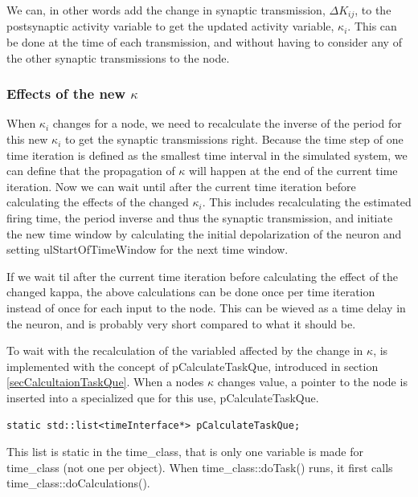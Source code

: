 			We can, in other words add the change in synaptic transmission, $\Delta K_{ij}$, to the postsynaptic activity variable to get the updated activity variable, $\kappa_i$.
			This can be done at the time of each transmission, and without having to consider any of the other synaptic transmissions to the node.
			

			\subsubsection{Effects of the new $\kappa$}
			When $\kappa_i$ changes for a node, we need to recalculate the inverse of the period for this new $\kappa_i$ to get the synaptic transmissions right.
			Because the time step of one time iteration is defined as the smallest time interval in the simulated system, we can define that the propagation of $\kappa$ will happen at the end of the current time iteration. %
			Now %
			 we can wait until after the current time iteration before calculating the effects of the changed $\kappa_i$.
			This includes recalculating the estimated firing time, the period inverse and thus the synaptic transmission, and initiate the new time window by calculating the initial depolarization of the neuron and setting 
				ulStartOfTimeWindow for the next time window.

			If we wait til after the current time iteration before calculating the effect of the changed kappa, the above calculations can be done once per time iteration instead of once for each input to the node.
			This can be wieved as a time delay in the neuron, and is probably  very short compared to what it should be. %


			To wait with the recalculation of the variabled affected by the change in $\kappa$, is implemented with the concept of pCalculateTaskQue, introduced in section \ref{secCalcultaionTaskQue}.
			When a nodes $\kappa$ changes value, a pointer to the node is inserted into a specialized que for this use, pCalculateTaskQue.
\begin{lstlisting}
static std::list<timeInterface*> pCalculateTaskQue;
\end{lstlisting}
			This list is static in the time\_class, that is only one variable is made for time\_class (not one per object).
			When time\_class::doTask() runs, it first calls time\_class::doCalculations().

